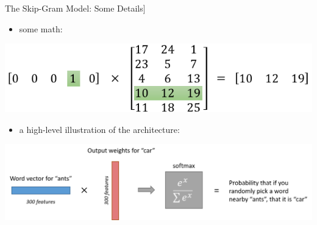 \documentclass[professionalfonts, xcolor={usenames,svgnames,x11names,table}]{beamer}
\begin{document}
\begin{frame}{The Skip-Gram Model: Some Details]}

\begin{itemize}
\item some math:
\end{itemize}

\begin{center}
        \includegraphics[width=0.8\linewidth]{./img/skip_gram_matrix}
\end{center}

\vspace{0.5cm}

\begin{itemize}
\item a high-level illustration of the architecture:
\end{itemize}

\begin{center}
        \includegraphics[width=1\linewidth]{./img/skip_gram2}
\end{center}

\end{frame}


\begin{frame}[plain]
    \begin{center}
    \end{center}
\end{frame}
\end{document}
